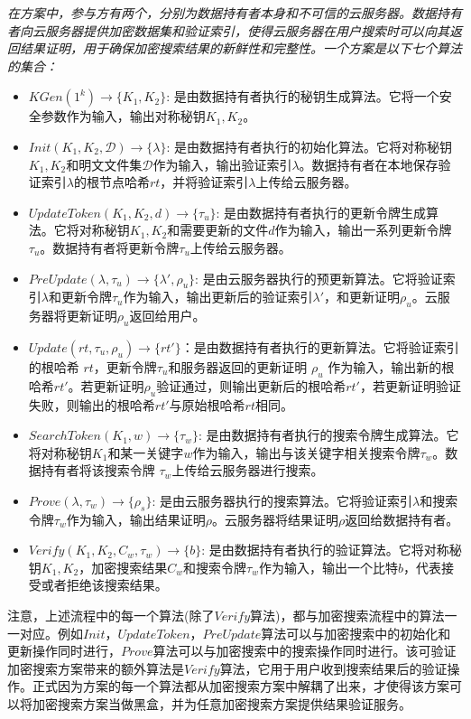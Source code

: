 \begin{definition}\label{def:single}
  {\itshape
      在\single 方案中，参与方有两个，分别为数据持有者本身和不可信的云服务器。数据持有者向云服务器提供加密数据集和验证索引，使得云服务器在用户搜索时可以向其返回结果证明，用于确保加密搜索结果的新鲜性和完整性。一个\single 方案是以下七个算法的集合：
      \begin{itemize}
        \item $KGen(1^k) \rightarrow \{K_1,K_2\}$: 是由数据持有者执行的秘钥生成算法。它将一个安全参数作为输入，输出对称秘钥$K_1,K_2$。
        \item $Init(K_1,K_2, \mathcal{D}) \rightarrow \{\lambda\}$: 是由数据持有者执行的初始化算法。它将对称秘钥$K_1,K_2$和明文文件集$\mathcal{D}$作为输入，输出验证索引$\lambda$。数据持有者在本地保存验证索引$\lambda$的根节点哈希$rt$，并将验证索引$\lambda$上传给云服务器。
        \item $UpdateToken(K_1,K_2, d) \rightarrow \{\tau_u\}$: 是由数据持有者执行的更新令牌生成算法。它将对称秘钥$K_1,K_2$和需要更新的文件$d$作为输入，输出一系列更新令牌$\tau_u$。数据持有者将更新令牌$\tau_u$上传给云服务器。
        \item $PreUpdate(\lambda, \tau_u) \rightarrow \{\lambda',\rho_u\}$: 是由云服务器执行的预更新算法。它将验证索引$\lambda$和更新令牌$\tau_u$作为输入，输出更新后的验证索引$\lambda'$，和更新证明$\rho_u$。云服务器将更新证明$\rho_u$返回给用户。
        \item $Update(rt,\tau_u,\rho_u) \rightarrow \{rt'\}$：是由数据持有者执行的更新算法。它将验证索引的根哈希 $rt$，更新令牌$\tau_u$和服务器返回的更新证明 $\rho_u$ 作为输入，输出新的根哈希$rt'$。若更新证明$\rho_u$验证通过，则输出更新后的根哈希$rt'$，若更新证明验证失败，则输出的根哈希$rt'$与原始根哈希$rt$相同。
        \item $SearchToken(K_1, w) \rightarrow \{\tau_{w}\}$: 是由数据持有者执行的搜索令牌生成算法。它将对称秘钥$K_1$和某一关键字$w$作为输入，输出与该关键字相关搜索令牌$\tau_{w}$。数据持有者将该搜索令牌 $\tau_{w}$上传给云服务器进行搜索。
        \item $Prove(\lambda, \tau_{w}) \rightarrow \{\rho_s\}$: 是由云服务器执行的搜索算法。它将验证索引$\lambda$和搜索令牌$\tau_{w}$作为输入，输出结果证明$\rho$。云服务器将结果证明$\rho$返回给数据持有者。
        \item $Verify(K_1,K_2, C_w, \tau_{w}) \rightarrow \{b\}$: 是由数据持有者执行的验证算法。它将对称秘钥$K_1,K_2$，加密搜索结果$C_w$和搜索令牌$\tau_{w}$作为输入，输出一个比特$b$，代表接受或者拒绝该搜索结果。
      \end{itemize}
      }
\end{definition}
注意，上述流程中的每一个算法(除了$Verify$算法)，都与加密搜索流程中的算法一一对应。例如$Init$，$UpdateToken$，$PreUpdate$算法可以与加密搜索中的初始化和更新操作同时进行，$Prove$算法可以与加密搜索中的搜索操作同时进行。该可验证加密搜索方案带来的额外算法是$Verify$算法，它用于用户收到搜索结果后的验证操作。正式因为\single 方案的每一个算法都从加密搜索方案中解耦了出来，才使得该方案可以将加密搜索方案当做黑盒，并为任意加密搜索方案提供结果验证服务。

